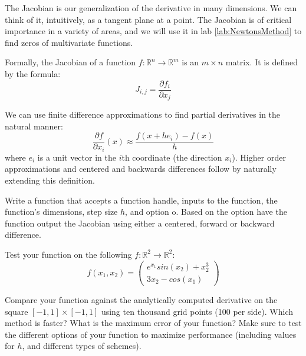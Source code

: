 

The Jacobian is our generalization of the derivative in many dimensions. We can think of it, intuitively, as a tangent plane at a point. The Jacobian is of critical importance in a variety of areas, and we will use it in lab \ref{lab:NewtonsMethod} to find zeros of multivariate functions.

Formally, the Jacobian of a function $f:\mathbb{R}^n \rightarrow \mathbb{R}^m$ is an $m \times n$ matrix. It is defined by the formula:
\begin{equation*}
J_{i,j} = \frac{\partial f_i}{\partial x_j}
\end{equation*}

We can use finite difference approximations to find partial derivatives in the natural manner:
\begin{equation*}
\frac{\partial f}{\partial x_i} (x) \approx \frac{f(x+h e_i)-f(x)}{h}
\end{equation*}
where $e_i$ is a unit vector in the $i$th coordinate (the direction $x_i$). Higher order approximations and centered and backwards differences follow by naturally extending this definition.

\begin{problem}
Write a function  that accepts a function handle, inputs to the function, the function's dimensions, step size $h$, and option o. Based on the option have the function output the Jacobian using either a centered, forward or backward difference.

Test your function on the following $f: \mathbb{R}^2 \to \mathbb{R}^2$:
\begin{equation*}
f(x_1, x_2) = 
\begin{pmatrix}
e^{x_1} sin(x_2) + x_2^3 \\
3x_2 - cos(x_1)
\end{pmatrix}
\end{equation*} 

Compare your  function against the analytically computed derivative on the square $[-1,1] \times [-1,1]$ using ten thousand grid points (100 per side). Which method is faster? What is the maximum error of your function? Make sure to test the different options of your function to maximize performance (including values for $h$, and different types of schemes).
\end{problem}


